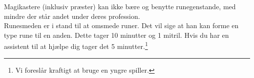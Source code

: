 Magikastere (inklusiv præster) kan ikke bære og benytte runegenstande, med mindre der står andet under deres profession.\\

Runesmeden er i stand til at omsmede runer. Det vil sige at han kan forme en type rune til en anden. Dette tager 10 minutter og 1 mitril. Hvis du har en assistent til at hjælpe dig tager det 5 minutter.\footnote{Vi foreslår kraftigt at bruge en yngre spiller.}\\


